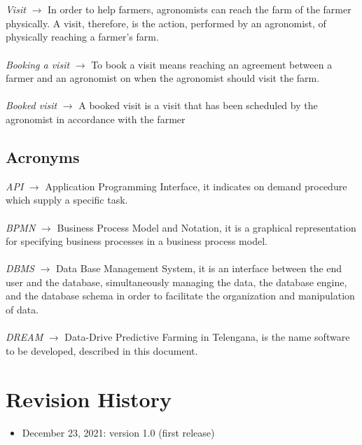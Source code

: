 \documentclass[10pt]{report}
\begin{document}
    \\ \\
    \emph{Visit} $\rightarrow$ In order to help farmers, agronomists can reach the farm of the farmer physically. A visit, therefore, is the action, performed by an agronomist, of physically reaching a farmer's farm.
    \\ \\
    \emph{Booking a visit} $\rightarrow$ To book a visit means reaching an agreement between a farmer and an agronomist on when the agronomist should visit the farm.
    \\ \\
    \emph{Booked visit} $\rightarrow$ A booked visit is a visit that has been scheduled by the agronomist in accordance with the farmer
    \subsection{Acronyms}
    \emph{API} $\rightarrow$ Application Programming Interface, it indicates on demand procedure which supply a specific task.\\ \\
    \emph{BPMN} $\rightarrow$ Business Process Model and Notation, it is a graphical representation for specifying business processes in a business process model.\\ \\
    \emph{DBMS} $\rightarrow$ Data Base Management System, it is an interface between the end user and the database, simultaneously managing the data, the database engine, and the database schema in order to facilitate the organization and manipulation of data.\\ \\
    \emph{DREAM} $\rightarrow$ Data-Drive Predictive Farming in Telengana, is the name software to be developed, described in this document.
    \section{Revision History}
    \begin{itemize}
        \item December 23, 2021: version 1.0 (first release)
    \end{itemize}
\end{document}
